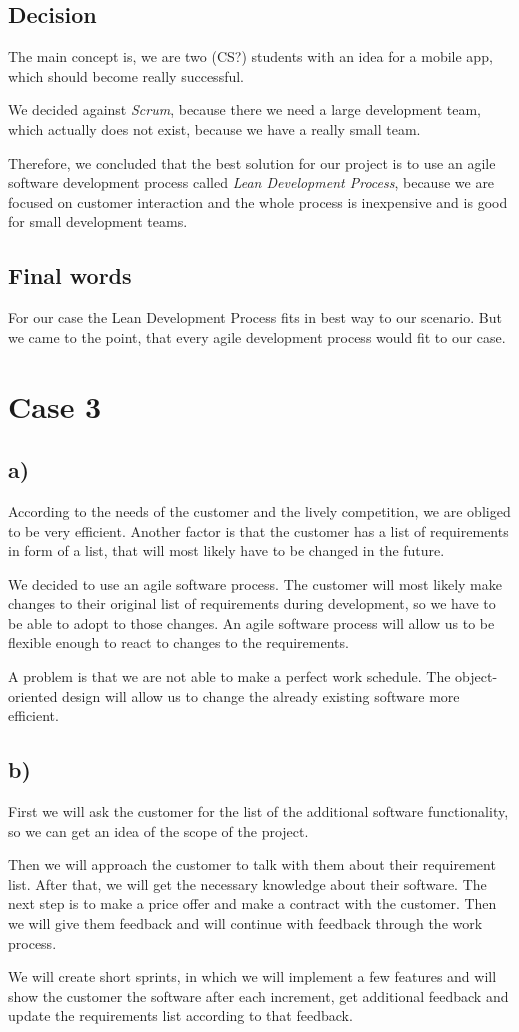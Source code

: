 \documentclass[a4paper, 12pt]{article}
\begin{document}
\subsection{Decision}
The main concept is, we are two (CS?) students with an idea for a mobile app, which should become really successful.

We decided against \emph{Scrum}, because there we need a large development team, which actually does not exist, because we have a really small team.

Therefore, we concluded that the best solution for our project is to use an agile software development process called \emph{Lean Development Process}, because we are focused on customer interaction and the whole process is inexpensive and is good for small development teams.

\subsection{Final words}
For our case the Lean Development Process fits in best way to our scenario. But we came to the point, that every agile development process would fit to our case.

\newpage
\section{Case 3}
\subsection{a)}
According to the needs of the customer and the lively competition, we are obliged to be very efficient. Another factor is that the customer has a list of requirements in form of a list, that will most likely have to be changed in the future.

We decided to use an agile software process. The customer will most likely make changes to their original list of requirements during development, so we have to be able to adopt to those changes. An agile software process will allow us to be flexible enough to react to changes to the requirements.

A problem is that we are not able to make a perfect work schedule. The object-oriented design will allow us to change the already existing software more efficient.

\subsection{b)}
First we will ask the customer for the list of the additional software functionality, so we can get an idea of the scope of the project.

Then we will approach the customer to talk with them about their requirement list. After that, we will get the necessary knowledge about their software. The next step is to make a price offer and make a contract with the customer. Then we will give them feedback and will continue with feedback through the work process.

We will create short sprints, in which we will implement a few features and will show the customer the software after each increment, get additional feedback and update the requirements list according to that feedback.
\end{document}
